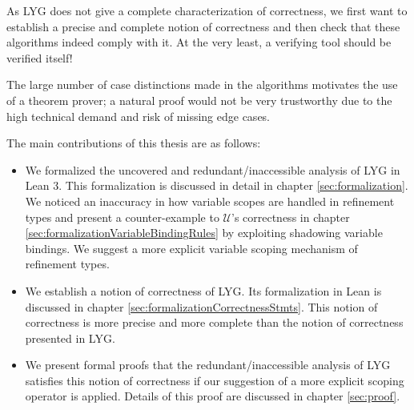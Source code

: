 As LYG does not give a complete characterization of correctness,
we first want to establish a precise and complete notion of correctness and then check that these algorithms indeed comply with it. At the very least, a verifying tool should be verified itself!

The large number of case distinctions made in the algorithms motivates the use of a theorem prover;
a natural proof would not be very trustworthy due to the high technical demand and risk of missing edge cases.

\vspace{\baselineskip}

The main contributions of this thesis are as follows:
\begin{itemize}
\item We formalized the uncovered and redundant/inaccessible analysis of LYG in Lean 3. This formalization is discussed in detail in chapter \ref{sec:formalization}.
We noticed an inaccuracy in how variable scopes are handled in refinement types
and present a counter-example to $\mathcal{U}$'s correctness in chapter \ref{sec:formalizationVariableBindingRules} by exploiting shadowing variable bindings.
We suggest a more explicit variable scoping mechanism of refinement types.
\item We establish a notion of correctness of LYG. Its formalization in Lean is discussed in chapter \ref{sec:formalizationCorrectnessStmts}. This notion of correctness is more precise and more complete than the notion of correctness presented in LYG.
\item We present formal proofs that the redundant/inaccessible analysis of LYG satisfies
    this notion of correctness if our suggestion of a more explicit scoping operator is applied. Details of this proof are discussed in chapter \ref{sec:proof}.

\end{itemize}